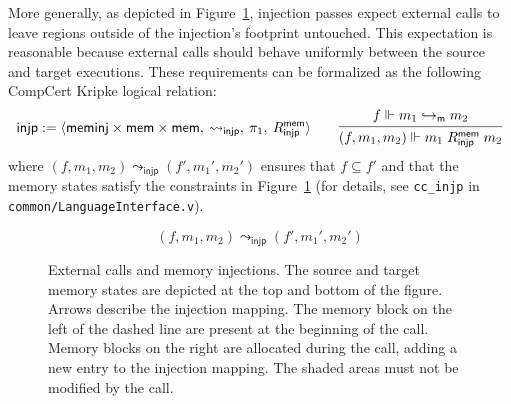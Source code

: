 \documentclass[11pt,oneside]{book}
\theoremstyle{definition}
\newcommand{\kw}[1]{\ensuremath{ \mathsf{#1} }}
\begin{document}
More generally,
as depicted in Figure~\ref{fig:injp},
injection passes expect external calls
to leave regions outside of the injection's footprint untouched.
This expectation is reasonable because
external calls
should behave uniformly between the source and target executions.
These requirements can be formalized as the
following CompCert Kripke logical relation:
\[
  \kw{injp} :=
    \langle
      \kw{meminj} \times \kw{mem} \times \kw{mem}, \:
      {\leadsto_\kw{injp}}, \:
      \pi_1, \:
      R^\kw{mem}_\kw{injp}
    \rangle
  \qquad
  \begin{prooftree}
    \hypo{f \Vdash m_1 \hookrightarrow_\kw{m} m_2}
    \infer1{(f, m_1, m_2) \Vdash m_1 \mathrel{R^\kw{mem}_\kw{injp}} m_2}
  \end{prooftree}
\]
where $(f, m_1, m_2) \leadsto_\kw{injp} (f', m_1', m_2')$
ensures that $f \subseteq f'$ and that the memory states
satisfy the constraints in Figure~\ref{fig:injp}
(for details,
see \texttt{cc\_injp} in \texttt{common/LanguageInterface.v}).

\begin{figure} %
  \centering
  \[ (f, m_1, m_2) \leadsto_\kw{injp} (f', m_1', m_2') \]
  \caption[External calls and memory injections]%
   {External calls and memory injections.
    The source and target memory states are
    depicted at the top and bottom
    of the figure. Arrows describe the injection mapping.
    The memory block on the left of the dashed line
    are present at the beginning of the call.
    Memory blocks on the right
    are allocated during the call,
    adding a new entry to the injection mapping.
    The shaded areas must not be modified by the call.
  }
  \label{fig:injp}
\end{figure}
\end{document}
